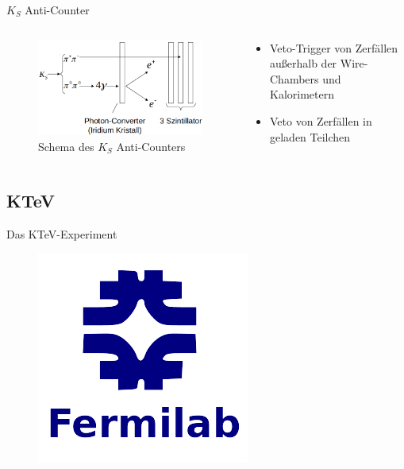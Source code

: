 \documentclass[aspectratio=1610, professionalfonts, 9pt, t]{beamer}
\begin{document}
  \begin{frame}{$K_S$ Anti-Counter}
    \begin{columns}[onlytextwidth]
      \begin{column}{0.4\textwidth}
        \begin{figure}[ht]
          \begin{center}
            \includegraphics[width=1.2\textwidth]{Images/na48aksschema.png} %
            \caption{Schema des $K_S$ Anti-Counters}
          \end{center}
        \end{figure}
      \end{column}
      \begin{column}{0.5\textwidth}
        \begin{itemize}
          \item Veto-Trigger von Zerfällen außerhalb der Wire-Chambers und Kalorimetern
          \item[\rightarrow] Veto von Zerfällen in geladen Teilchen
        \end{itemize}
      \end{column}
    \end{columns}
  \end{frame}

  \subsection{KTeV}

  \begin{frame}{Das KTeV-Experiment}
    \begin{figure}
      \includegraphics[height=0.8\textheight]{Images/rip.png}
    \end{figure}
  \end{frame}
\end{document}
